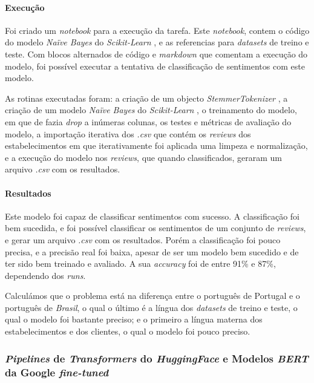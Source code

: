 \paragraph{Execução\\}

Foi criado um \textit{notebook} para a execução da tarefa. Este \textit{notebook}, contem o código do modelo \textit{Naïve Bayes} do \textit{Scikit-Learn} \cite{skl1}, e as referencias para \textit{datasets} de treino e teste. Com blocos alternados de código e \textit{markdown} que comentam a execução do modelo, foi possível executar a tentativa de classificação de sentimentos com este modelo.

As rotinas executadas foram: a criação de um objecto \textit{StemmerTokenizer} \cite{skl1}, a criação de um modelo \textit{Naïve Bayes} do \textit{Scikit-Learn} \cite{skl1}, o treinamento do modelo, em que de fazia \textit{drop} a inúmeras colunas, os testes e métricas de avaliação do modelo, a importação iterativa dos \textit{.csv} que contém os \textit{reviews} dos estabelecimentos em que iterativamente foi aplicada uma limpeza e normalização, e a execução do modelo nos \textit{reviews}, que quando classificados, geraram um arquivo \textit{.csv} com os resultados.

\paragraph{Resultados\\}

Este modelo foi capaz de classificar sentimentos com sucesso. A classificação foi bem sucedida, e foi possível classificar os sentimentos de um conjunto de \textit{reviews}, e gerar um arquivo \textit{.csv} com os resultados. Porém a classificação foi pouco precisa, e a precisão real foi baixa, apesar de ser um modelo bem sucedido e de ter sido bem treinado e avaliado. A sua \textit{accuracy} foi de entre 91\% e 87\%, dependendo dos \textit{runs}.

Calculámos que o problema está na diferença entre o português de Portugal e o português de \textit{Brasil}, o qual o último é a língua dos \textit{datasets} de treino e teste, o qual o modelo foi bastante preciso; e o primeiro a língua materna dos estabelecimentos e dos clientes, o qual o modelo foi pouco preciso.

\subsubsection{\textit{Pipelines} de \textit{Transformers} do \textit{HuggingFace} e Modelos \textit{BERT} da Google \textit{fine-tuned}}

